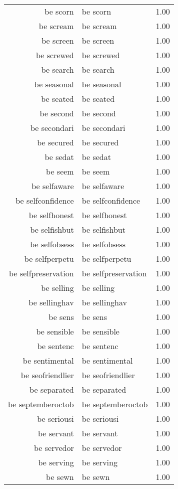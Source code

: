 \begin{table}[ht]
\begin{tabular}{rlr}
  be scorn & be scorn & 1.00 \\ 
  be scream & be scream & 1.00 \\ 
  be screen & be screen & 1.00 \\ 
  be screwed & be screwed & 1.00 \\ 
  be search & be search & 1.00 \\ 
  be seasonal & be seasonal & 1.00 \\ 
  be seated & be seated & 1.00 \\ 
  be second & be second & 1.00 \\ 
  be secondari & be secondari & 1.00 \\ 
  be secured & be secured & 1.00 \\ 
  be sedat & be sedat & 1.00 \\ 
  be seem & be seem & 1.00 \\ 
  be selfaware & be selfaware & 1.00 \\ 
  be selfconfidence & be selfconfidence & 1.00 \\ 
  be selfhonest & be selfhonest & 1.00 \\ 
  be selfishbut & be selfishbut & 1.00 \\ 
  be selfobsess & be selfobsess & 1.00 \\ 
  be selfperpetu & be selfperpetu & 1.00 \\ 
  be selfpreservation & be selfpreservation & 1.00 \\ 
  be selling & be selling & 1.00 \\ 
  be sellinghav & be sellinghav & 1.00 \\ 
  be sens & be sens & 1.00 \\ 
  be sensible & be sensible & 1.00 \\ 
  be sentenc & be sentenc & 1.00 \\ 
  be sentimental & be sentimental & 1.00 \\ 
  be seofriendlier & be seofriendlier & 1.00 \\ 
  be separated & be separated & 1.00 \\ 
  be septemberoctob & be septemberoctob & 1.00 \\ 
  be seriousi & be seriousi & 1.00 \\ 
  be servant & be servant & 1.00 \\ 
  be servedor & be servedor & 1.00 \\ 
  be serving & be serving & 1.00 \\ 
  be sewn & be sewn & 1.00 \\ 

\end{tabular}
\end{table}
